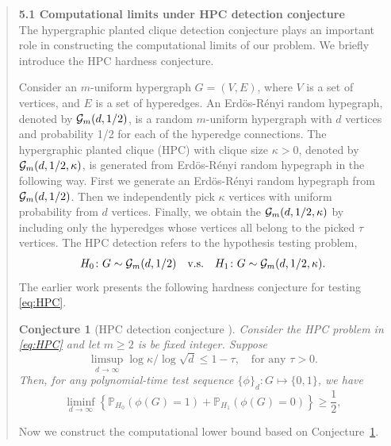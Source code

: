 \documentclass[11pt]{article}
\theoremstyle{plain}
\newtheorem{conj}{Conjecture}
\theoremstyle{definition}
\begin{document}
\begin{enumerate}[wide, labelwidth=!, labelindent=0pt]
\begin{quote}
{{{\bf 5.1 Computational limits under HPC detection conjecture}\\

The hypergraphic planted clique detection conjecture plays an important role in constructing the computational limits of our problem. We briefly introduce the HPC hardness conjecture. 

Consider an $m$-uniform hypergraph $G = (V,E)$, where $V$ is a set of vertices, and $E$ is a set of hyperedges. An Erd\"os-R\'enyi random hypegraph, denoted by $\mathcal{G}_m(d,1/2)$, is a random $m$-uniform hypergraph with $d$ vertices and probability 1/2 for each of the hyperedge connections. The hypergraphic planted clique (HPC) with clique size $\kappa>0$, denoted by $\mathcal{G}_m(d,1/2,\kappa)$, is generated from Erd\"os-R\'enyi random hypegraph in the following way. First we generate an Erd\"os-R\'enyi random hypegraph from $\mathcal{G}_m(d,1/2)$. Then we independently pick $\kappa$ vertices with uniform probability from $d$ vertices. Finally, we obtain the $\mathcal{G}_m(d,1/2,\kappa)$ by including only the hyperedges whose vertices all belong to the picked $\tau$ vertices. The HPC detection refers to the hypothesis testing problem, 
\begin{align}\label{eq:HPC}
    H_0\colon G\sim \mathcal{G}_m(d,1/2)\quad\text{v.s.}\quad H_1\colon G\sim \mathcal{G}_m(d,1/2,\kappa).
\end{align}
The earlier work \citep{luo2022tensor} presents the following hardness conjecture for testing \eqref{eq:HPC}.
\begin{conj}[HPC detection conjecture \citep{luo2022tensor}]\label{conj:1} Consider the HPC problem in \eqref{eq:HPC} and let $m\geq 2$ is be fixed integer. Suppose
\[
   \limsup_{d\rightarrow\infty} \log\kappa/\log\sqrt{d}\leq 1-\tau,\quad \text{for any }\tau >0.
   \]
Then, for any polynomial-time test sequence $\{\phi\}_d\colon G \mapsto \{0,1\}$, we have 
\[
\liminf_{d\rightarrow\infty} \left\{\mathbb{P}_{H_0}(\phi(G) = 1)+ \mathbb{P}_{H_1}(\phi(G) = 0)\right\}\geq \frac{1}{2},
\]
\end{conj}

Now we construct the computational lower bound based on Conjecture~\ref{conj:1}. 

}}
\end{quote}
\end{enumerate}
\end{document}
